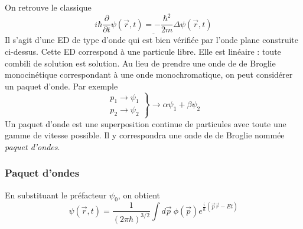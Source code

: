		On retrouve le classique
		\begin{equation}
		\underline{i\hbar\dfrac{\partial}{\partial t}\psi(\vec{r},t)= -\dfrac{\hbar^2}{2m}\Delta\psi(\vec{r},t)}
		\end{equation}
		Il s'agit d'une ED de type d'onde qui est bien vérifiée par l'onde plane construite ci-dessus. 
		Cette ED correspond à une particule libre. Elle est linéaire : toute combili de solution est 
		solution. Au lieu de prendre une onde de de Broglie monocinétique correspondant à une onde 
		monochromatique, on peut considérer un paquet d'onde. Par exemple
		\begin{equation}
		\left.\begin{array}{ll}
		p_1 \rightarrow \psi_1\\
		p_2 \rightarrow \psi_2
		\end{array}\right\}\longrightarrow \alpha\psi_1+\beta\psi_2
		\end{equation}
		Un paquet d'onde est une superposition continue de particules avec toute une gamme de vitesse 
		possible. Il y correspondra une onde de de Broglie nommée \textit{paquet d'ondes}.

		\subsubsection{Paquet d'ondes}
		En substituant le préfacteur $\psi_0$, on obtient
		\begin{equation}
		\psi(\vec{r},t) = \dfrac{1}{(2\pi\hbar)^{3/2}}\int d\vec{p}\ \phi(\vec{p})e^{\frac{i}{\hbar}(\vec{p}
		\vec{r}-Et)}
		\end{equation}
		
